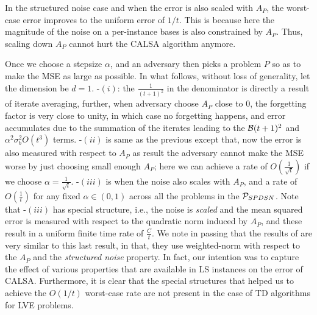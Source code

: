 In the structured noise case and when the error is also scaled with $A_P$, the worst-case error improves to 
the uniform error of $1/t$. This is because here the magnitude of the noise on a per-instance bases is also constrained
by $A_P$. Thus, scaling down $A_P$ cannot hurt the CALSA algorithm anymore.

\if
Once we choose a stepsize $\alpha$, and an adversary then picks a problem $P$ so as to make the MSE as large as possible.  In what follows, without loss of generality, let the dimension be $d=1$.
-$(i)$: the $\frac{1}{(t+1)^2}$ in the denominator is directly a result of iterate averaging,  further, when adversary choose $A_P$ close to $0$, the forgetting factor is very close to unity, in which case no forgetting happens, and error accumulates due to the summation of the iterates leading to the $\B(t+1)^2$ and $\alpha^2 \sigma_b^2 O(t^3)$ terms. -$(ii)$ is same as the previous except that, now the error is also measured with respect to $A_P$ as result the adversary cannot make the MSE worse by just choosing small enough $A_P$; here we can achieve a rate of $O(\frac{1}{\sqrt{t}})$ if we choose $\alpha=\frac{1}{\sqrt{t}}$. -$(iii)$ is when the noise also scales with $A_P$, and a rate of $O(\frac{1}{t})$ for any fixed $\alpha\in(0,1)$ across all the problems in the $\P_{SPDSN}$. Note that -$(iii)$ has special structure, i.e., the noise is \emph{scaled} and the mean squared error is measured with respect to the quadratic norm induced by $A_P$, and these result in a uniform finite time rate of $\frac{C}{t}$. 
\fi
We note in passing that the results of \citet{bach} are very similar to this last result, in that, they use weighted-norm with respect to the $A_P$ and the \emph{structured noise} property. 
In fact, our intention was to capture the effect of various properties that are available in LS instances on the error
of CALSA.
Furthermore, it is clear that the special structures that helped us to achieve the $O(1/t)$ worst-case rate
are not present in the case of TD algorithms for LVE problems.

